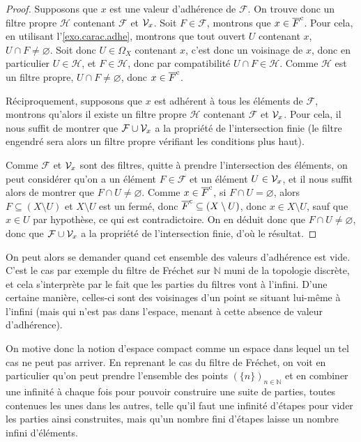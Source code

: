 \begin{proof}
  Supposons que $x$ est une valeur d'adhérence de $\mathcal F$. On trouve donc
  un filtre propre $\mathcal H$ contenant $\mathcal F$ et $\mathcal{V}_x$. Soit
  $F\in\mathcal F$, montrons que $x\in \overline{F}^{\mathrm c}$. Pour cela, en utilisant
  l'\cref{exo.carac.adhe}, montrons que
  tout ouvert $U$ contenant $x$, $U\cap F\neq\varnothing$. Soit donc
  $U\in \Omega_X$ contenant $x$, c'est donc un voisinage de $x$, donc en
  particulier $U\in\mathcal H$, et $F\in\mathcal H$, donc par compatibilité
  $U\cap F \in\mathcal H$. Comme $\mathcal H$ est un filtre propre,
  $U\cap F \neq \varnothing$, donc $x\in\overline{F}^{\mathrm c}$.

  Réciproquement, supposons que $x$ est adhérent à tous les éléments de
  $\mathcal F$, montrons qu'alors il existe un filtre propre $\mathcal H$
  contenant $\mathcal F$ et $\mathcal{V}_x$. Pour cela, il nous suffit de montrer que
  $\mathcal F\cup\mathcal{V}_x$ a la propriété de l'intersection finie (le filtre
  engendré sera alors un filtre propre vérifiant les conditions plus haut).

  Comme $\mathcal F$ et $\mathcal{V}_x$ sont des filtres, quitte à prendre
  l'intersection des éléments, on peut considérer qu'on a un élément
  $F\in\mathcal F$ et un élément $U\in\mathcal{V}_x$, et il nous suffit alors de
  montrer que $F\cap U \neq\varnothing$. Comme $x\in\overline{F}^{\mathrm c}$, si
  $F\cap U = \varnothing$, alors $F\subseteq (X\setminus U)$ et $X\setminus U$
  est un fermé, donc $\overline{F}^{\mathrm c} \subseteq (X\setminus U)$, donc
  $x\in X\setminus U$, sauf que $x\in U$ par hypothèse, ce qui est
  contradictoire. On en déduit donc que $F\cap U \neq\varnothing$, donc que
  $\mathcal F\cup\mathcal{V}_x$ a la propriété de l'intersection finie, d'où le
  résultat.
\end{proof}

On peut alors se demander quand cet ensemble des valeurs d'adhérence est vide.
C'est le cas par exemple du filtre de Fréchet sur $\mathbb N$ muni de la
topologie discrète, et cela s'interprète par le fait que les parties du filtres
vont à l'infini. D'une certaine manière, celles-ci sont des voisinages d'un
point se situant lui-même à l'infini (mais qui n'est pas dans l'espace, menant
à cette absence de valeur d'adhérence).

On motive donc la notion d'espace compact comme un espace dans lequel un tel cas
ne peut pas arriver. En reprenant le cas du filtre de Fréchet, on voit en
particulier qu'on peut prendre l'ensemble des points
$(\{n\})_{n\in\mathbb N}$ et en combiner une infinité à chaque fois pour
pouvoir construire une suite de parties, toutes contenues les unes dans
les autres, telle qu'il faut une infinité d'étapes pour vider les parties
ainsi construites, mais qu'un nombre fini d'étapes laisse un nombre infini
d'éléments.

